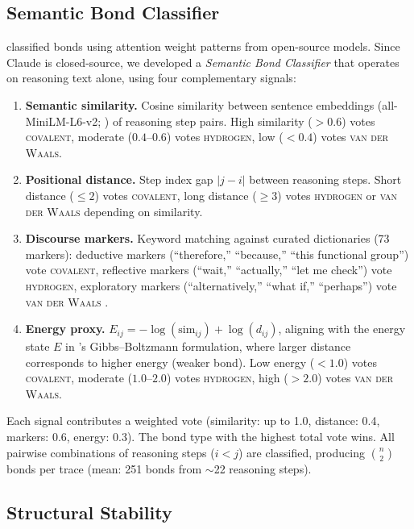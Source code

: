 \documentclass[11pt]{article}
\newcommand{\cov}{\textsc{covalent}}
\newcommand{\hyd}{\textsc{hydrogen}}
\newcommand{\vdw}{\textsc{van der Waals}}
\begin{document}
\subsection{Semantic Bond Classifier}
\label{sec:classifier}

\citet{chen2026molecular} classified bonds using attention weight patterns from open-source models. Since Claude is closed-source, we developed a \emph{Semantic Bond Classifier} that operates on reasoning text alone, using four complementary signals:

\begin{enumerate}[leftmargin=*]
    \item \textbf{Semantic similarity.} Cosine similarity between sentence embeddings (all-MiniLM-L6-v2; \citealp{reimers2019sentence}) of reasoning step pairs. High similarity ($> 0.6$) votes \cov{}, moderate ($0.4$--$0.6$) votes \hyd{}, low ($< 0.4$) votes \vdw{}.

    \item \textbf{Positional distance.} Step index gap $|j - i|$ between reasoning steps. Short distance ($\leq 2$) votes \cov{}, long distance ($\geq 3$) votes \hyd{} or \vdw{} depending on similarity.

    \item \textbf{Discourse markers.} Keyword matching against curated dictionaries (73 markers): deductive markers (``therefore,'' ``because,'' ``this functional group'') vote \cov{}, reflective markers (``wait,'' ``actually,'' ``let me check'') vote \hyd{}, exploratory markers (``alternatively,'' ``what if,'' ``perhaps'') vote \vdw{} \citep{pitler2009automatic}.

    \item \textbf{Energy proxy.} $E_{ij} = -\log(\text{sim}_{ij}) + \log(d_{ij})$, aligning with the energy state $E$ in \citet{chen2026molecular}'s Gibbs--Boltzmann formulation, where larger distance corresponds to higher energy (weaker bond). Low energy ($< 1.0$) votes \cov{}, moderate ($1.0$--$2.0$) votes \hyd{}, high ($> 2.0$) votes \vdw{}.
\end{enumerate}

Each signal contributes a weighted vote (similarity: up to 1.0, distance: 0.4, markers: 0.6, energy: 0.3). The bond type with the highest total vote wins. All pairwise combinations of reasoning steps ($i < j$) are classified, producing $\binom{n}{2}$ bonds per trace (mean: 251 bonds from $\sim$22 reasoning steps).

\subsection{Structural Stability}
\label{sec:stability}
\end{document}
